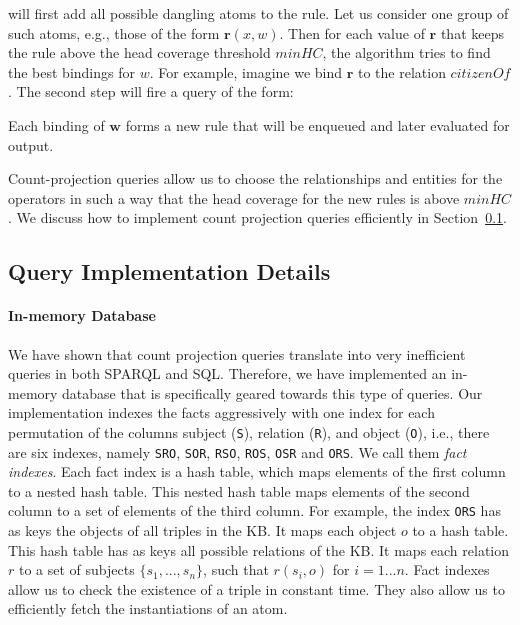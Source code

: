 \noindent will first add all possible dangling atoms to the rule. Let us consider one group of such atoms, e.g., those of the form
$\bm{r}(x,w)$. Then for each
value of $\bm{r}$ that keeps the rule above the head coverage threshold $minHC$, the algorithm tries to find the best bindings for 
$w$. For example, imagine we bind $\bm{r}$ to the relation $citizenOf$. The second step will fire a query of the form:


\noindent Each binding of $\bm{w}$ forms a new rule that will be enqueued and later evaluated for output.

Count-projection queries allow us to choose the relationships and entities for the operators 
in such a way that the head coverage for the new rules is above $minHC$.
We discuss how to implement count projection queries efficiently in Section~\ref{subsec:implementation}.

\subsection{Query Implementation Details}
\label{subsec:implementation}

\paragraph{In-memory Database} We have shown \cite{amie} that count projection queries translate into very inefficient queries in both SPARQL and SQL. Therefore, we have implemented an in-memory database that is specifically geared towards this type of queries.
Our implementation indexes the facts aggressively with one index for each permutation of 
the columns subject (\texttt{S}), relation (\texttt{R}), and object (\texttt{O}), i.e., there are six indexes, namely \texttt{SRO}, \texttt{SOR}, \texttt{RSO}, \texttt{ROS}, \texttt{OSR} and \texttt{ORS}. We call them \emph{fact indexes}.
Each fact index is a hash table, which maps elements of the first column to a nested hash table. This nested hash table maps elements of the second column to a set of elements of the third column. For example, the index \texttt{ORS} has as keys the objects of all triples in the KB. It maps each object $o$ to a hash table. This hash table has as keys all possible relations of the KB. It maps each relation $r$ to a set of subjects $\{s_1,...,s_n\}$, such that $r(s_i, o)$ for $i=1...n$.
Fact indexes allow us to check the existence of a triple in constant time. They also allow us to efficiently fetch the instantiations of an atom.

